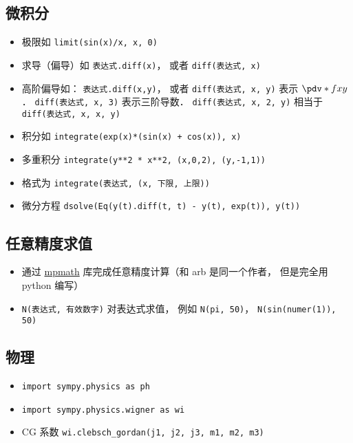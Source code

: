 \subsection{微积分}
\begin{itemize}
\item 极限如 \verb|limit(sin(x)/x, x, 0)|
\item 求导（偏导）如 \verb|表达式.diff(x)|， 或者 \verb|diff(表达式, x)|
\item 高阶偏导如： \verb|表达式.diff(x,y)|， 或者 \verb|diff(表达式, x, y)| 表示 $\pdv*{f}{x}{y}$． \verb|diff(表达式, x, 3)| 表示三阶导数． \verb|diff(表达式, x, 2, y)| 相当于 \verb|diff(表达式, x, x, y)|
\item 积分如 \verb|integrate(exp(x)*(sin(x) + cos(x)), x)|
\item 多重积分 \verb|integrate(y**2 * x**2, (x,0,2), (y,-1,1))|
\item 格式为 \verb|integrate(表达式, (x, 下限, 上限))|
\item 微分方程 \verb|dsolve(Eq(y(t).diff(t, t) - y(t), exp(t)), y(t))|
\end{itemize}


\subsection{任意精度求值}
\begin{itemize}
\item 通过 \href{https://mpmath.org/}{mpmath} 库完成任意精度计算（和 arb 是同一个作者， 但是完全用 python 编写）
\item \verb|N(表达式, 有效数字)| 对表达式求值， 例如 \verb|N(pi, 50)|， \verb|N(sin(numer(1)), 50)|
\end{itemize}

\subsection{物理}
\begin{itemize}
\item \verb|import sympy.physics as ph|
\item \verb|import sympy.physics.wigner as wi|
\item CG 系数 \verb|wi.clebsch_gordan(j1, j2, j3, m1, m2, m3)|
\end{itemize}
